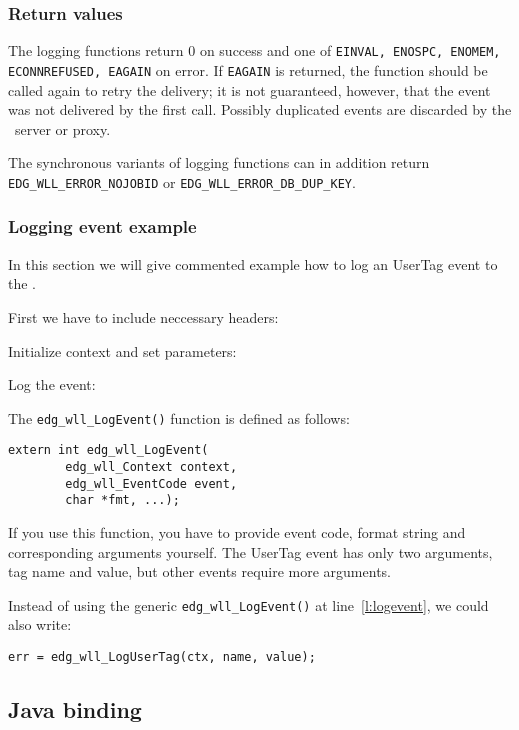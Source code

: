 \subsubsection{Return values}
The logging functions return 0 on success and one of \texttt{EINVAL,
ENOSPC, ENOMEM, ECONNREFUSED, EAGAIN} on error. If \texttt{EAGAIN} is
returned, the function should be called again to retry the delivery;
it is not guaranteed, however, that the event was not delivered by the
first call. Possibly duplicated events are discarded by the \LB\
server or proxy.

The synchronous variants of logging functions can in addition return
\verb'EDG_WLL_ERROR_NOJOBID' or \verb'EDG_WLL_ERROR_DB_DUP_KEY'.

\subsubsection{Logging event example}
In this section we will give commented example how to log an UserTag event to
the \LB.

First we have to include neccessary headers:


Initialize context and set parameters:




Log the event:


The \verb'edg_wll_LogEvent()' function is defined as follows:
\begin{lstlisting}[numbers=none]
extern int edg_wll_LogEvent(
        edg_wll_Context context,
        edg_wll_EventCode event,
        char *fmt, ...);
\end{lstlisting}
If you use this function, you have to provide event code, format
string and corresponding arguments yourself. The UserTag event has
only two arguments, tag name and value, but other events require more
arguments. 

Instead of using the generic \verb'edg_wll_LogEvent()' at line~\ref{l:logevent}, we could also
write:
\begin{lstlisting}
err = edg_wll_LogUserTag(ctx, name, value);
\end{lstlisting}

\subsection{Java binding}

